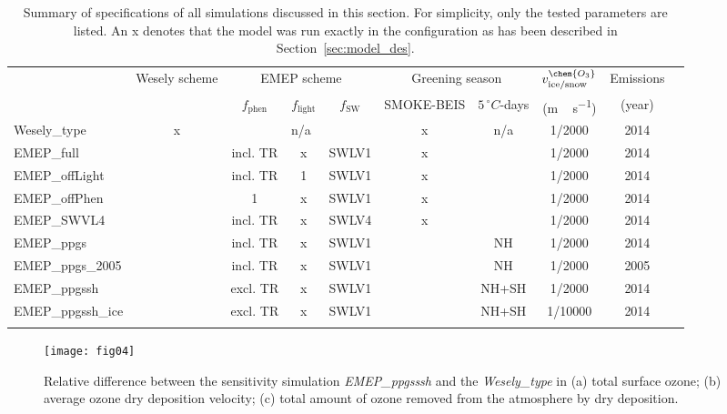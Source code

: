 \documentclass[gmd, manuscript]{copernicus}
\begin{document}
\begin{table}[t]
  \caption{Summary of specifications of all simulations discussed in this section. For simplicity, only the tested parameters are listed. An x denotes that the model was run exactly in the configuration as has been described in Section~\ref{sec:model_des}.}
  \begin{tabular}{lccccccccc}
    \tophline
    \multirow{2}{*}{Simulation} & Wesely scheme & \multicolumn{3}{c}{EMEP scheme} & \multicolumn{2}{c}{Greening season} & $v^\chem{O_3}_\text{ice/snow}$ & Emissions\\
    & & $f_\text{phen}$ & $f_\text{light}$ & $f_\text{SW}$ & SMOKE-BEIS & $5\,\unit{^\circ C}$-days & (\unit{m\,s^{-1}}) & (year)\\
    \middlehline
    Wesely\_type      & x & \multicolumn{3}{c}{n/a}  & x & n/a   & 1/2000  & 2014 \\
    EMEP\_full        &   & incl. TR & x & SWLV1     & x &       & 1/2000  & 2014 \\
    EMEP\_offLight    &   & incl. TR & 1 & SWLV1     & x &       & 1/2000  & 2014 \\
    EMEP\_offPhen     &   & 1        & x & SWLV1     & x &       & 1/2000  & 2014 \\
    EMEP\_SWVL4       &   & incl. TR & x & SWLV4     & x &       & 1/2000  & 2014 \\
    EMEP\_ppgs        &   & incl. TR & x & SWLV1     &   & NH    & 1/2000  & 2014 \\
    EMEP\_ppgs\_2005  &   & incl. TR & x & SWLV1     &   & NH    & 1/2000  & 2005 \\
    EMEP\_ppgssh      &   & excl. TR & x & SWLV1     &   & NH+SH & 1/2000  & 2014 \\
    EMEP\_ppgssh\_ice &   & excl. TR & x & SWLV1     &   & NH+SH & 1/10000 & 2014 \\
    \bottomhline
  \end{tabular}
  \label{tab:simsum}
\end{table}
%
\begin{figure}[t]
  \texttt{[image: fig04]}
  \caption{Relative difference between the sensitivity simulation \emph{EMEP\_ppgsssh} and the \emph{Wesely\_type} in (a) total surface ozone; (b) average ozone dry deposition velocity; (c) total amount of ozone removed from the atmosphere by dry deposition.}
  \label{fig:diff_maps}
\end{figure}
%
\end{document}
